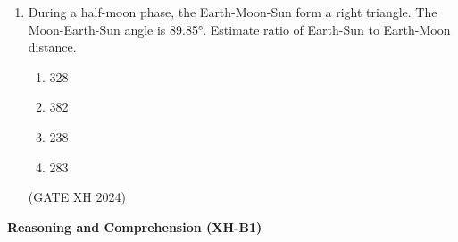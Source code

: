 \documentclass{article}
\begin{document}
\begin{enumerate}
    Rule: The number in a cell represents the count of crosses around its immediate neighboring cells (left, right, top, bottom, diagonals). As per this rule, the maximum number of crosses possible in the empty column is 

    \begin{multicols}{4}
        \begin{enumerate}
            \item 0
            \item 1
            \item 2
            \item 3
        \end{enumerate}
    \end{multicols} \hfill (GATE XH 2024)

    \item During a half-moon phase, the Earth-Moon-Sun form a right triangle. The Moon-Earth-Sun angle is 89.85°. Estimate ratio of Earth-Sun to Earth-Moon distance.

    \begin{multicols}{4}
        \begin{enumerate}
            \item 328
            \item 382
            \item 238
            \item 283
        \end{enumerate}
    \end{multicols} \hfill (GATE XH 2024)
\end{enumerate}
 
\maketitle
\noindent \textbf{Reasoning and Comprehension (XH-B1)}
\end{document}
